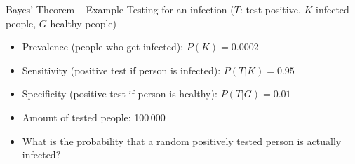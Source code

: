 \documentclass[
                en,
                ]{sdqbeamer}
\begin{document}
\begin{frame}{Bayes' Theorem -- Example}
    Testing for an infection ($T$: test positive, $K$ infected people,
    $G$ healthy people)
    \vfill
    \begin{itemize}
        \setlength\itemsep{2em}
        \item Prevalence (people who get infected): $P(K) = 0.0002$
        \item Sensitivity (positive test if person is infected): $P(T|K) = 0.95$
        \item Specificity (positive test if person is healthy): $P(T|G) = 0.01$
        \item Amount of tested people: 100\,000
        \item What is the probability that a random positively tested person is
            actually infected?



    \end{itemize}
\end{frame}
\end{document}
